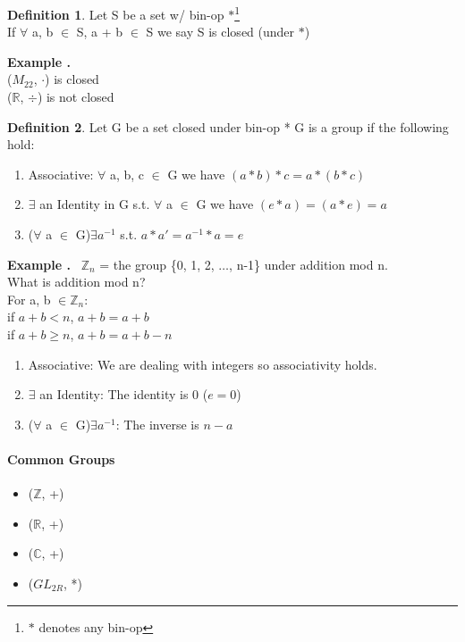 \documentclass{article}
\newcounter{example}
\newcounter{solution}
\theoremstyle{definition}
\newtheorem{definition}{Definition}[section]
\theoremstyle{claim}
\theoremstyle{remark}
\newcommand\Example{%
  \stepcounter{example}%
  \textbf{Example \theexample.}~%
  \setcounter{solution}{0}%
}
\begin{document}
\begin{flushleft}
\begin{definition}{Let S be a set w/ bin-op $*$\footnote{$*$ denotes any bin-op}}\\
If $\forall$ a, b $\in$ S, a + b $\in$ S we say S is closed (under $*$)
\end{definition}
\Example                            \\
($M_{22}$, $\cdot$) is closed       \\
($\mathbb{R}$, $\div$) is not closed\\
\begin{definition}{Let G be a set closed under bin-op *}
G is a group if the following hold:
\begin{enumerate}
  \item Associative: $\forall$ a, b, c $\in$ G we have $(a * b) * c = a * (b * c)$
  \item $\exists$ an Identity in G s.t. $\forall$ a $\in$ G we have $(e * a) = (a * e) = a$
  \item ($\forall$ a $\in$ G)$\exists a^{-1}$ s.t. $a * a\prime = a^{-1} * a = e$
\end{enumerate}
\end{definition}
\Example $\mathbb{Z}_{n}$ = the group \{0, 1, 2, $\dots$, n-1\} under addition mod n.\\
What is addition mod n?\newline \\
For a, b $\in \mathbb{Z}_{n}$:  \\
if $a + b < n$, $a + b = a + b$ \\
if $a + b \geq n$, $a + b = a + b - n$\newline\\

\begin{enumerate}
  \item Associative: We are dealing with integers so associativity holds.
  \item $\exists$ an Identity: The identity is 0 ($e = 0$) 
  \item ($\forall$ a $\in$ G)$\exists a^{-1}$: The inverse is $n - a$
\end{enumerate}

\paragraph{Common Groups}
\begin{itemize}
  \item ($\mathbb{Z}$, +)
  \item ($\mathbb{R}$, +)
  \item ($\mathbb{C}$, +)
  \item ($GL_{2R}$, *)
\end{itemize}


\end{flushleft}
\end{document}

